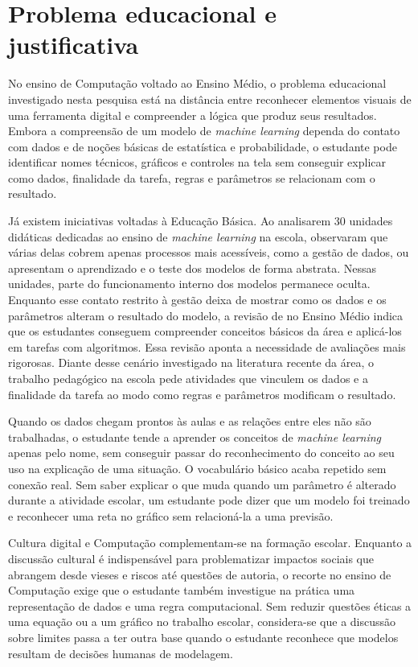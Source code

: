 \section{Problema educacional e justificativa}

No ensino de Computação voltado ao Ensino Médio, o problema educacional investigado nesta pesquisa está na distância entre reconhecer elementos visuais de uma ferramenta digital e compreender a lógica que produz seus resultados. Embora a compreensão de um modelo de \textit{machine learning} dependa do contato com dados e de noções básicas de estatística e probabilidade, o estudante pode identificar nomes técnicos, gráficos e controles na tela sem conseguir explicar como dados, finalidade da tarefa, regras e parâmetros se relacionam com o resultado.

Já existem iniciativas voltadas à Educação Básica. Ao analisarem 30 unidades didáticas dedicadas ao ensino de \textit{machine learning} na escola,  observaram que várias delas cobrem apenas processos mais acessíveis, como a gestão de dados, ou apresentam o aprendizado e o teste dos modelos de forma abstrata. Nessas unidades, parte do funcionamento interno dos modelos permanece oculta. Enquanto esse contato restrito à gestão deixa de mostrar como os dados e os parâmetros alteram o resultado do modelo, a revisão de  no Ensino Médio indica que os estudantes conseguem compreender conceitos básicos da área e aplicá-los em tarefas com algoritmos. Essa revisão aponta a necessidade de avaliações mais rigorosas. Diante desse cenário investigado na literatura recente da área, o trabalho pedagógico na escola pede atividades que vinculem os dados e a finalidade da tarefa ao modo como regras e parâmetros modificam o resultado.

Quando os dados chegam prontos às aulas e as relações entre eles não são trabalhadas, o estudante tende a aprender os conceitos de \textit{machine learning} apenas pelo nome, sem conseguir passar do reconhecimento do conceito ao seu uso na explicação de uma situação. O vocabulário básico acaba repetido sem conexão real. Sem saber explicar o que muda quando um parâmetro é alterado durante a atividade escolar, um estudante pode dizer que um modelo foi treinado e reconhecer uma reta no gráfico sem relacioná-la a uma previsão.

Cultura digital e Computação complementam-se na formação escolar. Enquanto a discussão cultural é indispensável para problematizar impactos sociais que abrangem desde vieses e riscos até questões de autoria, o recorte no ensino de Computação exige que o estudante também investigue na prática uma representação de dados e uma regra computacional. Sem reduzir questões éticas a uma equação ou a um gráfico no trabalho escolar, considera-se que a discussão sobre limites passa a ter outra base quando o estudante reconhece que modelos resultam de decisões humanas de modelagem.

